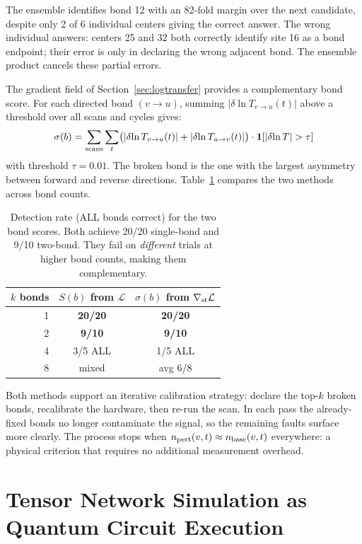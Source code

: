 \documentclass[11pt]{article}
\begin{document}
The ensemble identifies bond 12 with an 82-fold margin over the next
candidate, despite only 2 of 6 individual centers giving the correct answer.
The wrong individual answers: centers 25 and 32 both correctly identify
site 16 as a bond endpoint; their error is only in declaring the wrong
adjacent bond. The ensemble product cancels these partial errors.

The gradient field of Section~\ref{sec:logtransfer} provides a complementary
bond score. For each directed bond $(v\to u)$, summing $|\delta\!\ln T_{v\to u}(t)|$
above a threshold over all scans and cycles gives:
\begin{equation}
    \sigma(b) = \sum_{\rm scans} \sum_t
    \bigl(|\delta\!\ln T_{v\to u}(t)| + |\delta\!\ln T_{u\to v}(t)|\bigr)
    \cdot \mathbf{1}[|\delta\!\ln T| > \tau]
    \label{eq:dlogT_score}
\end{equation}
with threshold $\tau=0.01$. The broken bond is the one with the largest
asymmetry between forward and reverse directions. Table~\ref{tab:comparison}
compares the two methods across bond counts.

\begin{table}[h]
\centering
\small
\begin{tabular}{rcc}
\toprule
$k$ bonds & $S(b)$ from $\mathcal{L}$ & $\sigma(b)$ from $\nabla_{\rm st}\mathcal{L}$ \\
\midrule
1  & \textbf{20/20} & \textbf{20/20} \\
2  & \textbf{9/10}  & \textbf{9/10}  \\
4  & 3/5 ALL        & 1/5 ALL        \\
8  & mixed          & avg 6/8        \\
\bottomrule
\end{tabular}
\caption{Detection rate (ALL bonds correct) for the two bond scores.
Both achieve 20/20 single-bond and 9/10 two-bond. They fail on
\emph{different} trials at higher bond counts, making them complementary.}
\label{tab:comparison}
\end{table}

Both methods support an iterative calibration strategy: declare the
top-$k$ broken bonds, recalibrate the hardware, then re-run the scan.
In each pass the already-fixed bonds no longer contaminate the signal,
so the remaining faults surface more clearly. The process stops when
$n_{\rm pert}(v,t) \approx n_{\rm base}(v,t)$ everywhere: a physical
criterion that requires no additional measurement overhead.

\section{Tensor Network Simulation as Quantum Circuit Execution}
\label{sec:tn}
\end{document}
